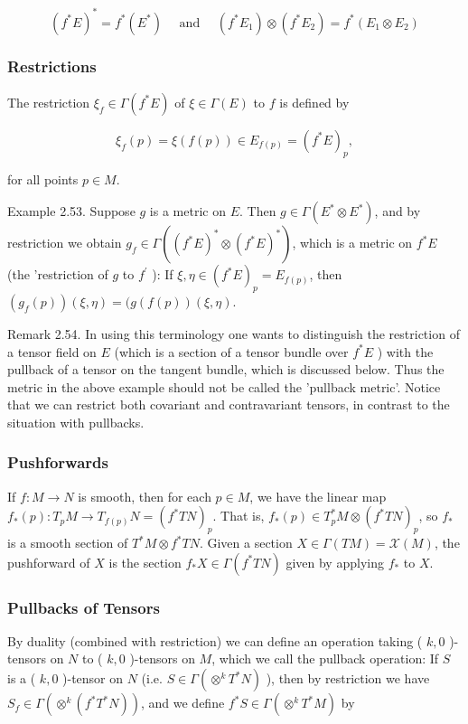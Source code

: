 \documentclass[10pt, letterpaper]{article}
\begin{document}
$$
\left(f^{*} E\right)^{*}=f^{*}\left(E^{*}\right) \quad \text { and } \quad\left(f^{*} E_{1}\right) \otimes\left(f^{*} E_{2}\right)=f^{*}\left(E_{1} \otimes E_{2}\right)
$$

\subsubsection*{Restrictions}
The restriction $\xi_{f} \in \Gamma\left(f^{*} E\right)$ of $\xi \in \Gamma(E)$ to $f$ is defined by

$$
\xi_{f}(p)=\xi(f(p)) \in E_{f(p)}=\left(f^{*} E\right)_{p},
$$

for all points $p \in M$.

Example 2.53. Suppose $g$ is a metric on $E$. Then $g \in \Gamma\left(E^{*} \otimes E^{*}\right)$, and by restriction we obtain $g_{f} \in \Gamma\left(\left(f^{*} E\right)^{*} \otimes\left(f^{*} E\right)^{*}\right)$, which is a metric on $f^{*} E$ (the 'restriction of $g$ to $f^{\prime}$ ): If $\xi, \eta \in\left(f^{*} E\right)_{p}=E_{f(p)}$, then $\left(g_{f}(p)\right)(\xi, \eta)=(g(f(p))(\xi, \eta)$.

Remark 2.54. In using this terminology one wants to distinguish the restriction of a tensor field on $E$ (which is a section of a tensor bundle over $f^{*} E$ ) with the pullback of a tensor on the tangent bundle, which is discussed below. Thus the metric in the above example should not be called the 'pullback metric'. Notice that we can restrict both covariant and contravariant tensors, in contrast to the situation with pullbacks.

\subsubsection*{Pushforwards}
If $f: M \rightarrow N$ is smooth, then for each $p \in M$, we have the linear map $f_{*}(p): T_{p} M \rightarrow T_{f(p)} N=\left(f^{*} T N\right)_{p}$. That is, $f_{*}(p) \in T_{p}^{*} M \otimes\left(f^{*} T N\right)_{p}$, so $f_{*}$ is a smooth section of $T^{*} M \otimes f^{*} T N$. Given a section $X \in \Gamma(T M)=\mathscr{X}(M)$, the pushforward of $X$ is the section $f_{*} X \in \Gamma\left(f^{*} T N\right)$ given by applying $f_{*}$ to $X$.

\subsubsection*{Pullbacks of Tensors}
By duality (combined with restriction) we can define an operation taking ( $k, 0$ )-tensors on $N$ to ( $k, 0$ )-tensors on $M$, which we call the pullback operation: If $S$ is a ( $k, 0$ )-tensor on $N$ (i.e. $S \in \Gamma\left(\otimes^{k} T^{*} N\right)$ ), then by restriction we have $S_{f} \in \Gamma\left(\otimes^{k}\left(f^{*} T^{*} N\right)\right)$, and we define $f^{*} S \in \Gamma\left(\otimes^{k} T^{*} M\right)$ by
\end{document}
